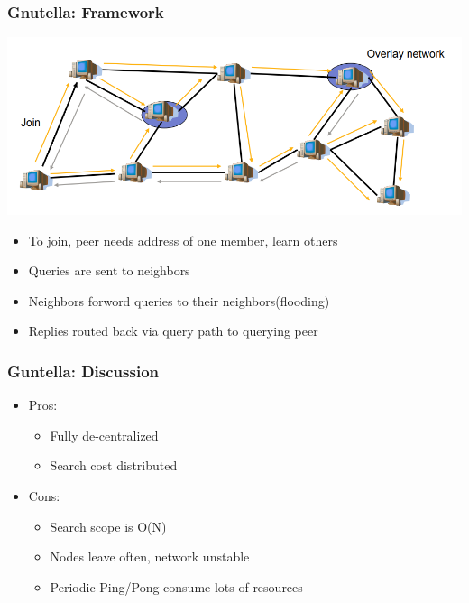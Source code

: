 \begin{frame}
    \frametitle{Gnutella: Framework}
    \includegraphics[scale=0.35]{figures/gnutella.png}
    \begin{itemize}
        \item To join, peer needs address of one member, learn others
        \item Queries are sent to neighbors
        \item Neighbors forword queries to their neighbors(\alert{flooding})
        \item Replies routed back via query path to querying peer
    \end{itemize}
\end{frame}

\begin{frame}
    \frametitle{Guntella: Discussion}
    \begin{itemize}
        \item Pros:
        \begin{itemize}
            \item Fully de-centralized
            \item Search cost distributed
        \end{itemize}
        \item Cons:
        \begin{itemize}
            \item Search scope is O(N)
            \item Nodes leave often, network unstable
            \item Periodic Ping/Pong consume lots of resources
        \end{itemize}
    \end{itemize}
\end{frame}

